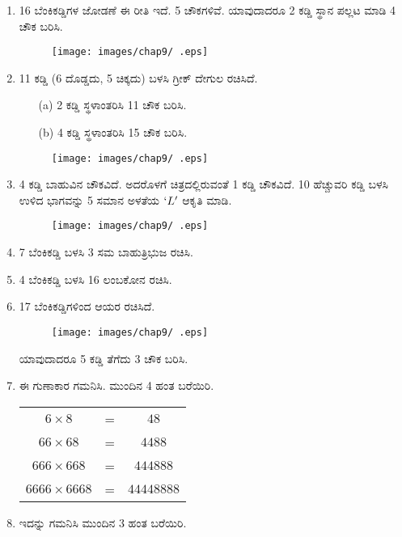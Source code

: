 \begin{enumerate}
\item 16 ಬೆಂಕಿಕಡ್ಡಿಗಳ ಜೋಡಣೆ ಈ ರೀತಿ ಇದೆ. 5 ಚೌಕಗಳಿವೆ. ಯಾವುದಾದರೂ 2 ಕಡ್ಡಿ ಸ್ಥಾನ ಪಲ್ಲಟ ಮಾಡಿ 4 ಚೌಕ ಬರಿಸಿ. 

\begin{figure}[!h]
\centering
\texttt{[image: images/chap9/ .eps]}
\end{figure}

\item 11 ಕಡ್ಡಿ (6 ದೊಡ್ಡದು, 5 ಚಿಕ್ಕದು) ಬಳಸಿ ಗ್ರೀಕ್ ದೇಗುಲ ರಚಿಸಿದೆ. 
\begin{itemize}
\item[(a)] 2 ಕಡ್ಡಿ ಸ್ಥಳಾಂತರಿಸಿ 11 ಚೌಕ ಬರಿಸಿ. 
\item[(b)] 4 ಕಡ್ಡಿ ಸ್ಥಳಾಂತರಿಸಿ 15 ಚೌಕ ಬರಿಸಿ. 
\end{itemize} 

\begin{figure}[!h]
\centering
\texttt{[image: images/chap9/ .eps]}
\end{figure}

\item 4 ಕಡ್ಡಿ ಬಾಹುವಿನ ಚೌಕವಿದೆ. ಅದರೊಳಗೆ ಚಿತ್ರದಲ್ಲಿರುವಂತೆ 1 ಕಡ್ಡಿ ಚೌಕವಿದೆ. 10 ಹೆಚ್ಚುವರಿ ಕಡ್ಡಿ ಬಳಸಿ ಉಳಿದ ಭಾಗವನ್ನು 5 ಸಮಾನ ಅಳತೆಯ $`L'$ ಆಕೃತಿ ಮಾಡಿ. 

\begin{figure}[!h]
\centering
\texttt{[image: images/chap9/ .eps]}
\end{figure}

\item 7 ಬೆಂಕಿಕಡ್ಡಿ ಬಳಸಿ 3 ಸಮ ಬಾಹುತ್ರಿಭುಜ ರಚಿಸಿ. 

\item 4 ಬೆಂಕಿಕಡ್ಡಿ ಬಳಸಿ 16 ಲಂಬಕೋನ ರಚಿಸಿ. 

\item 17 ಬೆಂಕಿಕಡ್ಡಿಗಳಿಂದ ಆಯರ ರಚಿಸಿದೆ. 
\begin{figure}[!h]
\centering
\texttt{[image: images/chap9/ .eps]}
\end{figure}
ಯಾವುದಾದರೂ 5 ಕಡ್ಡಿ ತೆಗೆದು 3 ಚೌಕ ಬರಿಸಿ. 

\item ಈ ಗುಣಾಕಾರ ಗಮನಿಸಿ. ಮುಂದಿನ 4 ಹಂತ ಬರೆಯಿರಿ. 

\begin{tabular}[t]{ccc}
$6\times 8$ & = & $48$\\
$66\times 68$ & = & $4488$\\
$666\times 668$ & = & $444888$\\
$6666\times 6668$ & = & $44448888$\\
\end{tabular}

\item ಇದನ್ನು ಗಮನಿಸಿ ಮುಂದಿನ 3 ಹಂತ ಬರೆಯಿರಿ. 


\end{enumerate}

